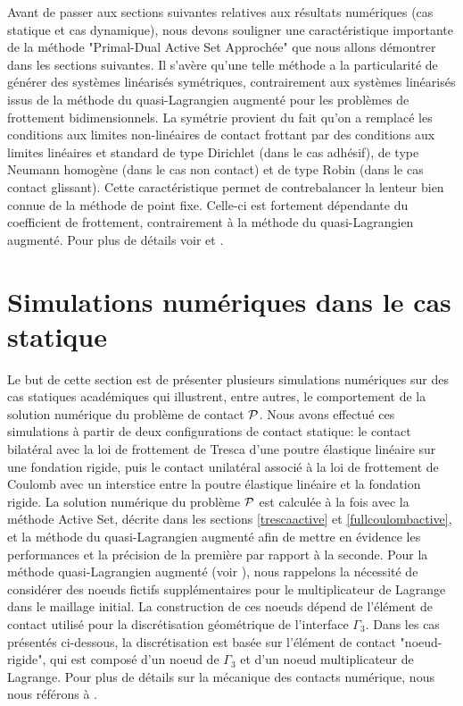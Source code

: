 Avant de passer aux sections suivantes relatives aux résultats numériques (cas statique et cas dynamique), nous devons souligner une caractéristique importante de la méthode "Primal-Dual Active Set Approchée" que nous allons démontrer dans les sections suivantes. Il s'avère qu'une telle méthode a la particularité de générer des systèmes linéarisés symétriques, contrairement aux systèmes linéarisés issus de la méthode du quasi-Lagrangien augmenté pour les problèmes de frottement bidimensionnels. La symétrie provient du fait qu'on a remplacé les conditions aux limites non-linéaires de contact frottant par des conditions aux limites linéaires et standard de type Dirichlet (dans le cas adhésif), de type Neumann homogène (dans le cas non contact) et de type Robin (dans le cas contact glissant). Cette caractéristique permet de contrebalancer la lenteur bien connue de la méthode de point fixe. Celle-ci est fortement dépendante du coefficient de frottement, contrairement à la méthode du quasi-Lagrangien augmenté. Pour plus de détails voir \cite{chabrand1998various} et \cite{lebon2003contact}.


\section{Simulations numériques dans le cas statique}\label{simu_stat}

Le but de cette section est de présenter plusieurs simulations numériques sur des cas statiques académiques qui illustrent, entre autres, le comportement de la solution numérique du problème de contact ${\cal P}$. Nous avons effectué ces simulations à partir de deux configurations de contact statique: le contact bilatéral avec la loi de frottement de Tresca d'une poutre élastique linéaire sur une fondation rigide, puis le contact unilatéral associé à la loi de frottement de Coulomb avec un interstice entre la poutre élastique linéaire et la fondation rigide. La solution numérique du problème ${\cal P}$ est calculée à la fois avec la méthode Active Set, décrite dans les sections \ref{trescaactive} et \ref{fullcoulombactive}, et la méthode du quasi-Lagrangien augmenté afin de mettre en évidence les performances et la précision de la première par rapport à la seconde. Pour la méthode quasi-Lagrangien augmenté (voir \cite{alart1991mixed}),
nous rappelons la nécessité de considérer des noeuds fictifs supplémentaires pour le multiplicateur de Lagrange dans le maillage initial.
La construction de ces noeuds dépend de l'élément de contact utilisé pour la discrétisation géométrique de l'interface $\Gamma_3$. Dans les cas présentés ci-dessous, la discrétisation est basée sur l'élément de contact "noeud-rigide", qui est composé d'un noeud de $\Gamma_3$ et d'un noeud multiplicateur de Lagrange. Pour plus de détails sur la mécanique des contacts numérique, nous nous référons à \cite{alart1991mixed, khenous2006discretization, khenous2006hybrid, laursen2013computational, wriggers2004computational}.

